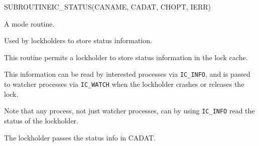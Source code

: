 \begin{routine} %
\subroutine
   {SUBROUTINE}{IC\_STATUS}{(CANAME, CADAT, CHOPT, IERR)}
\begin{overview}
A \watcher mode routine.

Used by lockholders to store status information.
\end{overview}
\begin{argdeflist}
\end{argdeflist}
\begin{describe}

This routine permits a lockholder to store status information in the
lock cache.

This information can be read by interested processes
via \verb|IC_INFO|, and is passed to watcher processes via
\verb|IC_WATCH| when the lockholder crashes or releases the lock.

Note that any process, not just watcher processes,
can by using \verb|IC_INFO| read the status of the lockholder.

The lockholder passes the status info in CADAT.

\end{describe}
\begin{options}
\end{options}
\begin{returncodes}
\end{returncodes}
\end{routine}

